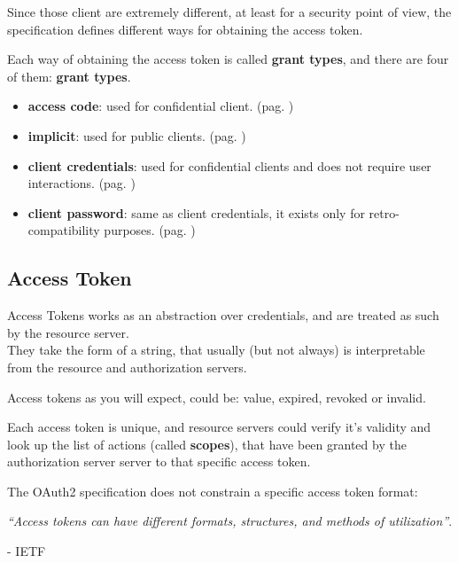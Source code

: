 Since those client are extremely different, at least for a security point of
view, the specification defines different ways for obtaining the access token.

Each way of obtaining the access token is called \textbf{grant types}, and
there are four of them:
\textbf{grant types}.
\begin{itemize}
    \item
        \textbf{access code}: used for confidential client. (pag. \pageref{sec:auth-code})
    \item
        \textbf{implicit}: used for public clients. (pag. \pageref{sec:implicit})
    \item
        \textbf{client credentials}: used for confidential clients and does not
        require user interactions. (pag. \pageref{sec:client-credentials})
    \item
        \textbf{client password}: same as client credentials, it exists only
        for retro-compatibility purposes. (pag. \pageref{sec:grant-password})
\end{itemize}

\subsection{Access Token}
Access Tokens works as an abstraction over credentials, and are treated as such
by the resource server.
\\
They take the form of a string, that usually (but not always) is interpretable
from the resource and authorization servers.

Access tokens as you will expect, could be: value, expired, revoked or invalid.

Each access token is unique, and resource servers could verify it's validity and
look up the list of actions (called \textbf{scopes}), that have been granted
by the authorization server server to that specific access token.

The OAuth2 specification does not constrain a specific access token format:

\begin{center}
\textit{``Access tokens can have different formats, structures, and methods of
utilization''}.
\end{center}
\begin{flushright}
    - IETF \cite{ietf-oauth}
\end{flushright}

